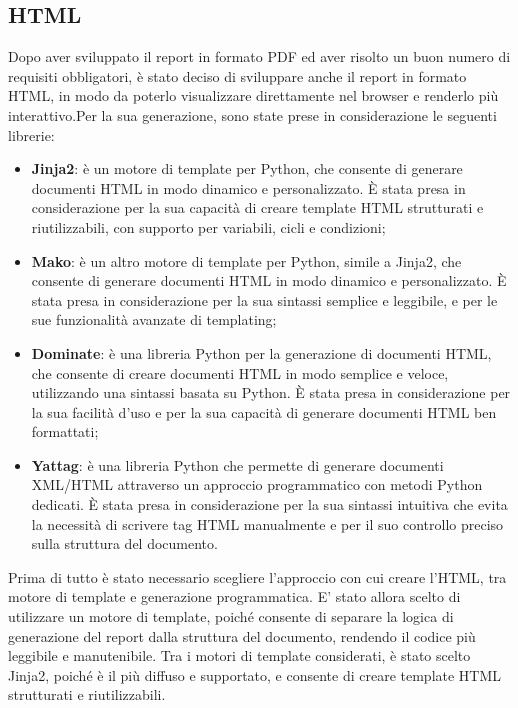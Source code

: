 \subsection{HTML}

Dopo aver sviluppato il report in formato PDF ed aver risolto un buon numero di requisiti obbligatori, è stato deciso di sviluppare anche il report in formato HTML, in modo da poterlo visualizzare direttamente nel browser e renderlo più interattivo.Per la sua generazione, sono state prese in considerazione le seguenti librerie:
\begin{itemize}
    \item \textbf{Jinja2}: è un motore di template per Python, che consente di generare documenti HTML in modo dinamico e personalizzato. È stata presa in considerazione per la sua capacità di creare template HTML strutturati e riutilizzabili, con supporto per variabili, cicli e condizioni;
    \item \textbf{Mako}: è un altro motore di template per Python, simile a Jinja2, che consente di generare documenti HTML in modo dinamico e personalizzato. È stata presa in considerazione per la sua sintassi semplice e leggibile, e per le sue funzionalità avanzate di templating;
    \item \textbf{Dominate}: è una libreria Python per la generazione di documenti HTML, che consente di creare documenti HTML in modo semplice e veloce, utilizzando una sintassi basata su Python. È stata presa in considerazione per la sua facilità d'uso e per la sua capacità di generare documenti HTML ben formattati;
    \item \textbf{Yattag}: è una libreria Python che permette di generare documenti XML/HTML attraverso un approccio programmatico con metodi Python dedicati. È stata presa in considerazione per la sua sintassi intuitiva che evita la necessità di scrivere tag HTML manualmente e per il suo controllo preciso sulla struttura del documento.
\end{itemize}

Prima di tutto è stato necessario scegliere l'approccio con cui creare l'HTML, tra motore di template e generazione programmatica. E' stato allora scelto di utilizzare un motore di template, poiché consente di separare la logica di generazione del report dalla struttura del documento, rendendo il codice più leggibile e manutenibile. Tra i motori di template considerati, è stato scelto Jinja2, poiché è il più diffuso e supportato, e consente di creare template HTML strutturati e riutilizzabili.

